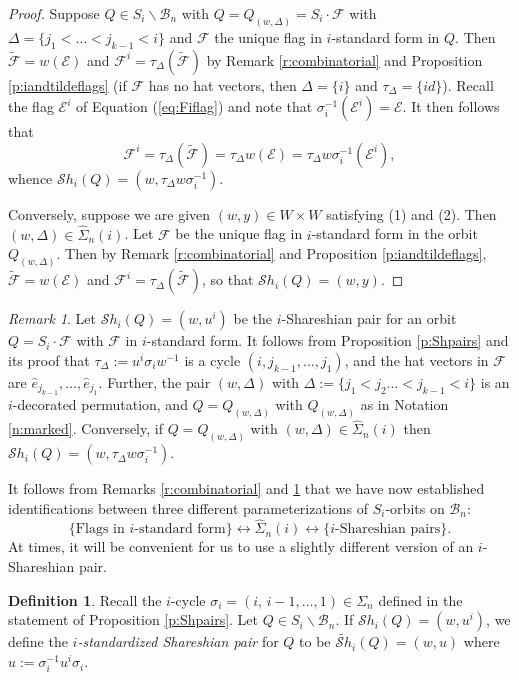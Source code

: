 \documentclass[12pt]{amsart}
\numberwithin{equation}{section}
\theoremstyle{remark}
\newtheorem{rem}[thm]{Remark}
\theoremstyle{definition}
\newtheorem{dfn}[thm]{Definition}
\newcommand{\B}{\mathcal{B}}
\newcommand{\he}{\hat{e}}
\newcommand{\F}{\mathcal{F}}
\newcommand{\Sh}{\mathcal{S}h}
\begin{document}
\begin{proof}
Suppose $Q\in S_{i}\backslash\B_{n}$ with $Q=Q_{(w,\Delta)}=S_{i}\cdot \F$ 
with $\Delta=\{j_{1}<\dots< j_{k-1}<i\}$ and $\F$ the unique flag in $i$-standard form in $Q$.  Then $\tilde{\F}=w(\mathcal{E})$ and $\F^{i}=\tau_{\Delta}(\tilde{\F})$ by Remark \ref{r:combinatorial} and
Proposition \ref{p:iandtildeflags} (if $\F$ has no hat vectors, then $\Delta=\{i\}$ and $\tau_{\Delta}=\{id\}$).  Recall the flag $\mathcal{E}^{i}$ of Equation (\ref{eq:Fiflag}) and note that $\sigma_{i}^{-1}(\mathcal{E}^{i})=\mathcal{E}$.  It then follows that 
$$
\F^{i}=\tau_{\Delta}(\tilde{\F})=\tau_{\Delta}w (\mathcal{E})=\tau_{\Delta}w\sigma_{i}^{-1}(\mathcal{E}^{i}),
$$
whence $\Sh_{i}(Q)=(w,\tau_{\Delta}w\sigma_{i}^{-1})$.  

Conversely, suppose we are given $(w,y)\in W\times W$ satisfying (1) and (2).  Then $(w,\Delta)\in\widehat{\Sigma}_{n}(i)$.  Let $\F$ be the unique flag in $i$-standard form in the orbit $Q_{(w,\Delta)}$.  Then by Remark \ref{r:combinatorial} and Proposition \ref{p:iandtildeflags}, $\tilde{\F}=w(\mathcal{E})$ and $\mathcal{F}^{i}=\tau_{\Delta}(\tilde{\F})$, so that $\Sh_{i}(Q)=(w,y)$.   



\end{proof}

\begin{rem}\label{r:whatisdelta}
Let $\Sh_{i}(Q)=(w, u^{i})$ be the $i$-Shareshian pair for an orbit $Q=S_{i}\cdot \F$ with $\F$ in $i$-standard form.  It follows from Proposition \ref{p:Shpairs} and its proof that  
$\tau_{\Delta}:=u^{i}\sigma_{i} w^{-1}$ is a cycle $(i, j_{k-1},\dots, j_{1})$, and the hat vectors in $\F$ are $\he_{j_{k-1}},\dots, \he_{j_{1}}$.  Further, the pair $(w,\Delta)$ with 
$\Delta:=\{j_{1}<j_{2}\dots<j_{k-1}<i\}$ is an $i$-decorated permutation, and $Q=Q_{(w,\Delta)}$ with $Q_{(w,\Delta)}$ as in Notation \ref{n:marked}.  Conversely, if 
$Q=Q_{(w,\Delta)}$ with $(w,\Delta)\in \widehat{\Sigma}_{n}(i)$ then $\Sh_{i}(Q)=(w,\tau_{\Delta} w\sigma_{i}^{-1})$.  
\end{rem}

It follows from Remarks \ref{r:combinatorial} and \ref{r:whatisdelta} that we have now established identifications between three different parameterizations of $S_{i}$-orbits on $\B_{n}$:
\begin{equation}\label{eq:differentparams}
\{\mbox{Flags in $i$-standard form}\}\leftrightarrow \widehat{\Sigma}_{n}(i)\leftrightarrow \{ i\mbox{-Shareshian pairs}\}.
\end{equation}
At times, it will be convenient for us to use a slightly different version of an $i$-Shareshian pair.
\begin{dfn}\label{d:standardizedpair}
Recall the $i$-cycle $\sigma_{i}=(i,\, i-1,\dots, 1)\in\Sigma_{n}$ defined in the statement of Proposition \ref{p:Shpairs}. 
Let $Q\in S_{i}\backslash\B_{n}$.  If $\Sh_{i}(Q)=(w,u^{i})$, we define the \emph{$i$-standardized Shareshian pair} for $Q$ to be $\widetilde{\Sh}_{i}(Q)=(w,u)$ where 
$u:=\sigma_{i}^{-1}u^{i}\sigma_{i}$.

\end{dfn}
\end{document}
